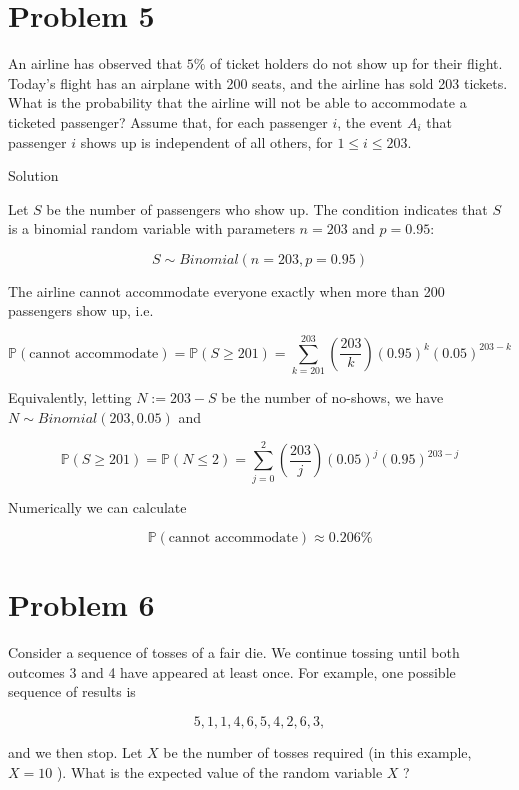 \documentclass{qlnotes-export}
\begin{document}
\section{Problem 5}\label{problem-5-2}

An airline has observed that \(5\%\) of ticket holders do not show up for their flight. Today's flight has an airplane with 200 seats, and the airline has sold 203 tickets. What is the probability that the airline will not be able to accommodate a ticketed passenger? Assume that, for each passenger \(i\), the event \(A_{i}\) that passenger \(i\) shows up is independent of all others, for \(1 \leq i \leq 203\).

\begin{qlsolution}{Solution}

Let \(S\) be the number of passengers who show up. The condition indicates that \(S\) is a binomial random variable with parameters \(n = 203\) and \(p = 0.95\):

\[S \sim Binomial(n = 203,p = 0.95)\]

The airline cannot accommodate everyone exactly when more than 200 passengers show up, i.e.

\[{\mathbb{P}}(\text{cannot accommodate}) = {\mathbb{P}}(S \geq 201) = \sum\limits_{k = 201}^{203}\left( \frac{203}{k} \right)(0.95)^{k}(0.05)^{203 - k}\]

Equivalently, letting \(N := 203 - S\) be the number of no-shows, we have \(N \sim Binomial(203,0.05)\) and

\[{\mathbb{P}}(S \geq 201) = {\mathbb{P}}(N \leq 2) = \sum\limits_{j = 0}^{2}\left( \frac{203}{j} \right)(0.05)^{j}(0.95)^{203 - j}\]

Numerically we can calculate

\[{\mathbb{P}}(\text{cannot accommodate}) \approx 0.206\%\]

\end{qlsolution}

\section{Problem 6}\label{problem-6-2}

Consider a sequence of tosses of a fair die. We continue tossing until both outcomes 3 and 4 have appeared at least once. For example, one possible sequence of results is

\[5,1,1,4,6,5,4,2,6,3,\]

and we then stop. Let \(X\) be the number of tosses required (in this example, \(X = 10\) ). What is the expected value of the random variable \(X\) ?
\end{document}

